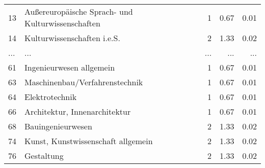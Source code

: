\begin{longtable}{lXrrr}
        13 & \multicolumn{1}{X}{Außereuropäische Sprach- und Kulturwissenschaften} & %
          \num{1} &
          \num[round-mode=places,round-precision=2]{0,67} &
          \num[round-mode=places,round-precision=2]{0,01} \\
        14 & \multicolumn{1}{X}{Kulturwissenschaften i.e.S.} & %
          \num{2} &
          \num[round-mode=places,round-precision=2]{1,33} &
          \num[round-mode=places,round-precision=2]{0,02} \\
       ... & ... & ... & ... & ... \\
        61 & \multicolumn{1}{X}{Ingenieurwesen allgemein} & %
          \num{1} &
          \num[round-mode=places,round-precision=2]{0,67} &
          \num[round-mode=places,round-precision=2]{0,01} \\

        63 & \multicolumn{1}{X}{Maschinenbau/Verfahrenstechnik} & %
          \num{1} &
          \num[round-mode=places,round-precision=2]{0,67} &
          \num[round-mode=places,round-precision=2]{0,01} \\

        64 & \multicolumn{1}{X}{Elektrotechnik} & %
          \num{1} &
          \num[round-mode=places,round-precision=2]{0,67} &
          \num[round-mode=places,round-precision=2]{0,01} \\

        66 & \multicolumn{1}{X}{Architektur, Innenarchitektur} & %
          \num{1} &
          \num[round-mode=places,round-precision=2]{0,67} &
          \num[round-mode=places,round-precision=2]{0,01} \\

        68 & \multicolumn{1}{X}{Bauingenieurwesen} & %
          \num{2} &
          \num[round-mode=places,round-precision=2]{1,33} &
          \num[round-mode=places,round-precision=2]{0,02} \\

        74 & \multicolumn{1}{X}{Kunst, Kunstwissenschaft allgemein} & %
          \num{2} &
          \num[round-mode=places,round-precision=2]{1,33} &
          \num[round-mode=places,round-precision=2]{0,02} \\

        76 & \multicolumn{1}{X}{Gestaltung} & %
          \num{2} &
          \num[round-mode=places,round-precision=2]{1,33} &
          \num[round-mode=places,round-precision=2]{0,02} \\


\end{longtable}

